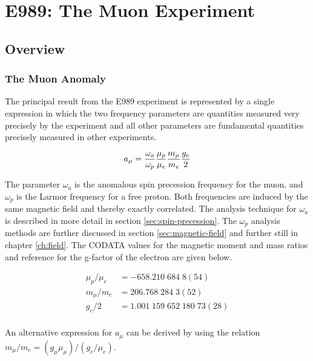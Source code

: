 \chapter {E989: The Muon \gmtwo Experiment} \label{ch:expt}

\section{Overview} \label{sec:expt-overview}

\subsection{The Muon Anomaly}

The principal result from the E989 experiment is represented by a single expression in which the two frequency parameters are quantities measured very precisely by the \mugmtwo experiment and all other parameters are fundamental quantities precisely measured in other experiments.

\begin{equation}
\label{eqn:g-2-result-1}
a_\mu = \frac{\omega_a}{\omega_p} \frac{\mu_p}{\mu_e} \\
\frac{m_\mu}{m_e} \frac{g_e}{2}
\end{equation}

\noindent
The parameter $\omega_a$ is the anomalous spin precession frequency for the muon, and $\omega_p$ is the Larmor frequency for a free proton.  Both frequencies are induced by the same magnetic field and thereby exactly correlated. The analysis technique for $\omega_a$ is described in more detail in section \ref{sec:spin-precession}.  The $\omega_p$ analysis methods are further discussed in section \ref{sec:magnetic-field} and further still in chapter \ref{ch:field}.  The CODATA values \cite{codata} for the magnetic moment and mass ratios and reference \cite{g-e-measurement} for the g-factor of the electron are given below.

\begin{align}
\mu_p/\mu_e & = -658.210\;684\;8(54) \\
m_\mu/m_e & = 206.768\;284\;3(52) \\
g_e/2 & = 1.001\;159\;652\;180\;73(28) \\
\end{align}

An alternative expression for $a_\mu$ can be derived by using the relation $m_\mu / m_e = (g_\mu \mu_\mu) / (g_e / \mu_e)$.  

